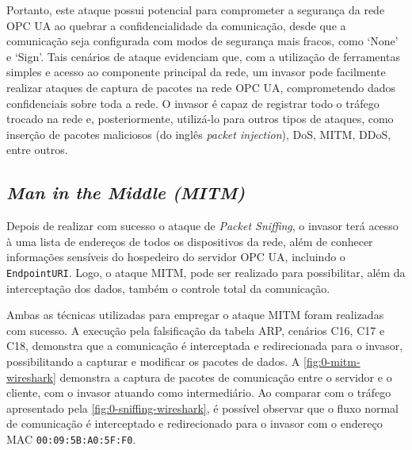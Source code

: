 Portanto, este ataque possui potencial para comprometer a segurança da rede OPC UA ao quebrar a confidencialidade da comunicação, desde que a comunicação seja configurada com modos de segurança mais fracos, como `None' e `Sign'. Tais cenários de ataque evidenciam que, com a utilização de ferramentas simples e acesso ao componente principal da rede, um invasor pode facilmente realizar ataques de captura de pacotes na rede OPC UA, comprometendo dados confidenciais sobre toda a rede. O invasor é capaz de registrar todo o tráfego trocado na rede e, posteriormente, utilizá-lo para outros tipos de ataques, como inserção de pacotes maliciosos (do inglês \textit{packet injection}), DoS, MITM, DDoS, entre outros.

\subsection{\textit{Man in the Middle (MITM)}}

Depois de realizar com sucesso o ataque de \textit{Packet Sniffing}, o invasor terá acesso à uma lista de endereços de todos os dispositivos da rede, além de conhecer informações sensíveis do hospedeiro do servidor OPC UA, incluindo o \texttt{EndpointURI}. Logo, o ataque MITM, pode ser realizado para possibilitar, além da interceptação dos dados, também o controle total da comunicação.

Ambas as técnicas utilizadas para empregar o ataque MITM foram realizadas com sucesso. A execução pela falsificação da tabela ARP, cenários C16, C17 e C18, demonstra que a comunicação é interceptada e redirecionada para o invasor, possibilitando a capturar e modificar os pacotes de dados. A \autoref{fig:0-mitm-wireshark} demonstra a captura de pacotes de comunicação entre o servidor e o cliente, com o invasor atuando como intermediário. Ao comparar com o tráfego apresentado pela \autoref{fig:0-sniffing-wireshark}, é possível observar que o fluxo normal de comunicação é interceptado e redirecionado para o invasor com o endereço MAC \texttt{00:09:5B:A0:5F:F0}.

